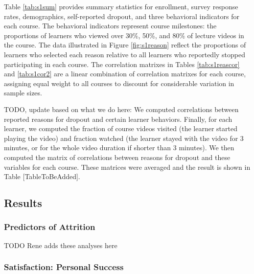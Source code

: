 \documentclass{sigchi}\usepackage[]{graphicx}\usepackage[]{color}
\begin{document}
Table \ref{tab:s1sum} provides summary statistics for enrollment, survey response rates, demographics, self-reported dropout, and three behavioral indicators for each course. The behavioral indicators represent course milestones: the proportions of learners who viewed over 30\%, 50\%, and 80\% of lecture videos in the course. The data illustrated in Figure \ref{fig:s1reason} reflect the proportions of learners who selected each reason relative to all learners who reportedly stopped participating in each course. The correlation matrixes in Tables \ref{tab:s1reascor} and \ref{tab:s1cor2} are a linear combination of correlation matrixes for each course, assigning equal weight to all courses to discount for considerable variation in sample sizes.

TODO, update based on what we do here: We computed correlations between reported reasons for dropout and certain learner behaviors. Finally, for each learner, we computed the fraction of course videos visited (the learner started playing the video) and fraction watched (the learner stayed with the video for 3 minutes, or for the whole video duration if shorter than 3 minutes). We then computed the matrix of correlations between reasons for dropout and these variables for each course. These matrices were averaged and the result is shown in Table [TableToBeAdded].


\subsection{Results}

\subsubsection{Predictors of Attrition}

TODO Rene adds these analyses here

\subsubsection{Satisfaction: Personal Success}
\end{document}

